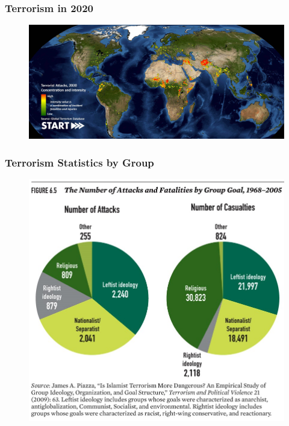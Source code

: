 \documentclass[handout]{beamer}
\begin{document}
\begin{frame} 
	\frametitle{\LARGE{Terrorism in 2020}}
	\begin{figure}[ht!]
		\centering
		\includegraphics[width=\textwidth,height=\textheight,keepaspectratio]{START_GTD-Heatmap_2020.jpg}
	\end{figure}
\end{frame}


\begin{frame} 
	\frametitle{\LARGE{Terrorism Statistics by Group}}
	\begin{figure}[ht!]
		\centering
		\includegraphics[width=\textwidth,height=\textheight,keepaspectratio]{Piazza2005.jpg}
	\end{figure}
\end{frame}
\end{document}
